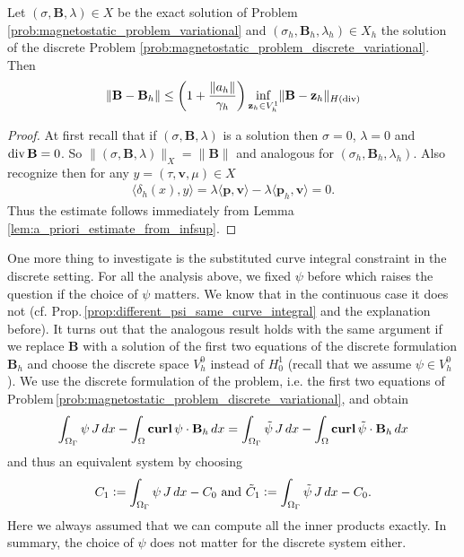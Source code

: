 \documentclass[../master_thesis.tex]{subfiles}
\begin{document}
\begin{theorem}
    Let $(\sigma,\mathbf{B},\lambda) \in X$ be 
    the exact solution of Problem \ref{prob:magnetostatic_problem_variational} 
    and 
    $(\sigma_h,\mathbf{B}_h,\lambda_h) \in X_h$ the solution of the discrete 
    Problem \ref{prob:magnetostatic_problem_discrete_variational}. Then 
    \begin{align*}
        \lVert \mathbf{B} - \mathbf{B}_h \rVert 
        \leq \left( 1 + \frac{\lVert a_h \rVert}{\gamma_h} \right)
            \inf_{\mathbf{z}_h \in V_h^1} \lVert \mathbf{B} - \mathbf{z}_h \rVert _{H(\operatorname{div})} 
    \end{align*}
\end{theorem}
\begin{proof}
    At first recall that if $(\sigma,\mathbf{B},\lambda)$ is a solution then 
    $\sigma = 0$, $\lambda = 0$ and $\operatorname{div} \mathbf{B}=0$. 
    So $\lVert (\sigma,\mathbf{B},\lambda) \rVert _X = \lVert \mathbf{B} \rVert $
    and analogous for $(\sigma_h,\mathbf{B}_h,\lambda_h)$.
    Also recognize then for any $y = (\tau,\mathbf{v}, \mu) \in X$
    \begin{align*}
        \langle \delta_h(x), y \rangle = \lambda \langle \mathbf{p}, \mathbf{v} \rangle 
        - \lambda \langle \mathbf{p}_h, \mathbf{v} \rangle = 0.
    \end{align*}
    Thus the estimate follows immediately from Lemma \ref{lem:a_priori_estimate_from_infsup}.
\end{proof}

One more thing to investigate is the substituted curve integral constraint in the 
discrete setting. For all the analysis above, we fixed $\psi$ before which 
raises the question if the choice of $\psi$ matters. We know that 
in the continuous case it does not (cf. Prop.\,\ref{prop:different_psi_same_curve_integral} 
and the explanation before). 
It turns out that the analogous result holds with the same argument if we replace $\mathbf{B}$ with 
a solution of the first two equations of the discrete formulation $\mathbf{B}_h$ and 
choose the discrete space $V_h^0$ instead of $H^1_0$ 
{\color{red}(recall that we assume $\psi \in V_h^0$)}. We use the discrete formulation of the problem, i.e.
the first two equations of Problem\,\ref{prob:magnetostatic_problem_discrete_variational},
and obtain
\begin{align}
    \int_{\Omega_\Gamma} \psi \, J \, dx -  \int_\Omega \veccurl \psi \cdot \mathbf{B}_h \, dx
    = \int_{\Omega_\Gamma} \tilde{\psi} \, J \, dx -  \int_\Omega \veccurl \tilde{\psi} \cdot \mathbf{B}_h \, dx
\end{align}
and thus an equivalent system by choosing 
\begin{align*}
    C_1 \vcentcolon= \int_{\Omega_\Gamma} \psi \, J \, dx - C_0 \text{ and }
    \tilde{C}_1 \vcentcolon= \int_{\Omega_\Gamma} \tilde{\psi} \, J \, dx - C_0.
\end{align*}
Here we always assumed that we can compute all the inner products exactly. 
In summary, the choice of $\psi$ does not matter for the discrete system either.
\end{document}
